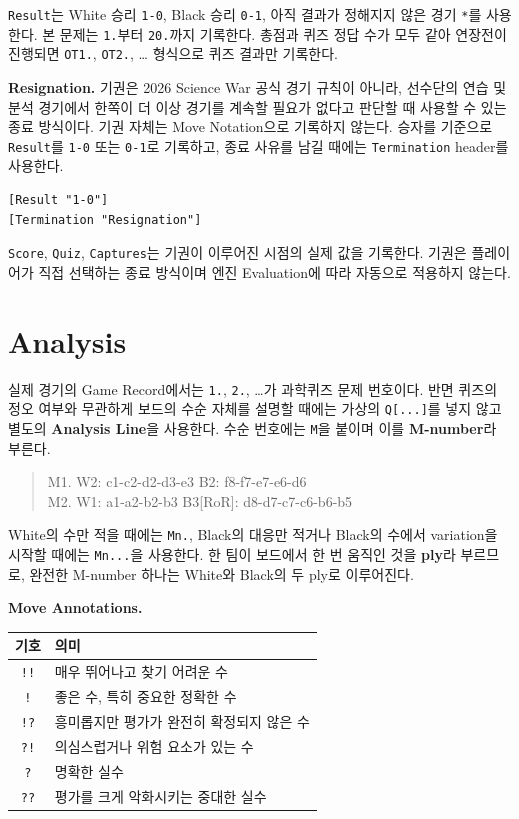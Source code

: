 \texttt{Result}는 White 승리 \texttt{1-0}, Black 승리 \texttt{0-1}, 아직 결과가 정해지지 않은 경기 \texttt{*}를 사용한다. 본 문제는 \texttt{1.}부터 \texttt{20.}까지 기록한다. 총점과 퀴즈 정답 수가 모두 같아 연장전이 진행되면 \texttt{OT1.}, \texttt{OT2.}, \ldots{} 형식으로 퀴즈 결과만 기록한다.

\medskip\noindent\textbf{Resignation.}
기권은 2026 Science War 공식 경기 규칙이 아니라, 선수단의 연습 및 분석 경기에서 한쪽이 더 이상 경기를 계속할 필요가 없다고 판단할 때 사용할 수 있는 종료 방식이다. 기권 자체는 Move Notation으로 기록하지 않는다. 승자를 기준으로 \texttt{Result}를 \texttt{1-0} 또는 \texttt{0-1}로 기록하고, 종료 사유를 남길 때에는 \texttt{Termination} header를 사용한다.
\begin{Verbatim}[fontsize=\small]
[Result "1-0"]
[Termination "Resignation"]
\end{Verbatim}
\texttt{Score}, \texttt{Quiz}, \texttt{Captures}는 기권이 이루어진 시점의 실제 값을 기록한다. 기권은 플레이어가 직접 선택하는 종료 방식이며 엔진 Evaluation에 따라 자동으로 적용하지 않는다.

\section{Analysis}

실제 경기의 Game Record에서는 \texttt{1.}, \texttt{2.}, \ldots{}가 과학퀴즈 문제 번호이다. 반면 퀴즈의 정오 여부와 무관하게 보드의 수순 자체를 설명할 때에는 가상의 \texttt{Q[...]}를 넣지 않고 별도의 \textbf{Analysis Line}을 사용한다. 수순 번호에는 \texttt{M}을 붙이며 이를 \textbf{M-number}라 부른다.
\begin{quote}\ttfamily
M1. W2: c1-c2-d2-d3-e3 B2: f8-f7-e7-e6-d6\\
M2. W1: a1-a2-b2-b3 B3[RoR]: d8-d7-c7-c6-b6-b5
\end{quote}
White의 수만 적을 때에는 \texttt{Mn.}, Black의 대응만 적거나 Black의 수에서 variation을 시작할 때에는 \texttt{Mn...}을 사용한다. 한 팀이 보드에서 한 번 움직인 것을 \textbf{ply}라 부르므로, 완전한 M-number 하나는 White와 Black의 두 ply로 이루어진다.

\medskip\noindent\textbf{Move Annotations.}
\begin{center}\renewcommand{\arraystretch}{1.15}\begin{tabular}{@{}cL{0.69\textwidth}@{}}\toprule
기호 & 의미 \\\midrule
\texttt{!!} & 매우 뛰어나고 찾기 어려운 수 \\
\texttt{!} & 좋은 수, 특히 중요한 정확한 수 \\
\texttt{!?} & 흥미롭지만 평가가 완전히 확정되지 않은 수 \\
\texttt{?!} & 의심스럽거나 위험 요소가 있는 수 \\
\texttt{?} & 명확한 실수 \\
\texttt{??} & 평가를 크게 악화시키는 중대한 실수 \\\bottomrule
\end{tabular}\end{center}

